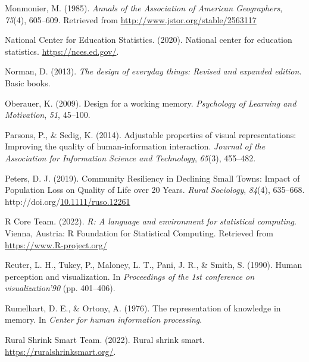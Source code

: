 \documentclass[print]{nuthesis}
\newlength{\cslhangindent}
\newenvironment{CSLReferences}[2]%
{\setlength{\parindent}{0pt}%
\everypar{\setlength{\hangindent}{\cslhangindent}}\ignorespaces}%
{\par}
\begin{document}
\begin{CSLReferences}{1}{0}
\leavevmode{}%
Monmonier, M. (1985). \emph{Annals of the Association of American Geographers}, \emph{75}(4), 605--609. Retrieved from \url{http://www.jstor.org/stable/2563117}

\leavevmode{}%
National Center for Education Statistics. (2020). National center for education statistics. \url{https://nces.ed.gov/}.

\leavevmode{}%
Norman, D. (2013). \emph{The design of everyday things: Revised and expanded edition}. Basic books.

\leavevmode{}%
Oberauer, K. (2009). Design for a working memory. \emph{Psychology of Learning and Motivation}, \emph{51}, 45--100.

\leavevmode{}%
Parsons, P., \& Sedig, K. (2014). Adjustable properties of visual representations: Improving the quality of human-information interaction. \emph{Journal of the Association for Information Science and Technology}, \emph{65}(3), 455--482.

\leavevmode{}%
Peters, D. J. (2019). Community {Resiliency} in {Declining} {Small} {Towns}: {Impact} of {Population} {Loss} on {Quality} of {Life} over 20 {Years}. \emph{Rural Sociology}, \emph{84}(4), 635--668. http://doi.org/\href{https://doi.org/10.1111/ruso.12261}{10.1111/ruso.12261}

\leavevmode{}%
R Core Team. (2022). \emph{R: A language and environment for statistical computing}. Vienna, Austria: R Foundation for Statistical Computing. Retrieved from \url{https://www.R-project.org/}

\leavevmode{}%
Reuter, L. H., Tukey, P., Maloney, L. T., Pani, J. R., \& Smith, S. (1990). Human perception and visualization. In \emph{Proceedings of the 1st conference on visualization'90} (pp. 401--406).

\leavevmode{}%
Rumelhart, D. E., \& Ortony, A. (1976). The representation of knowledge in memory. In \emph{Center for human information processing}.

\leavevmode{}%
Rural Shrink Smart Team. (2022). Rural shrink smart. \url{https://ruralshrinksmart.org/}.


\end{CSLReferences}
\end{document}
